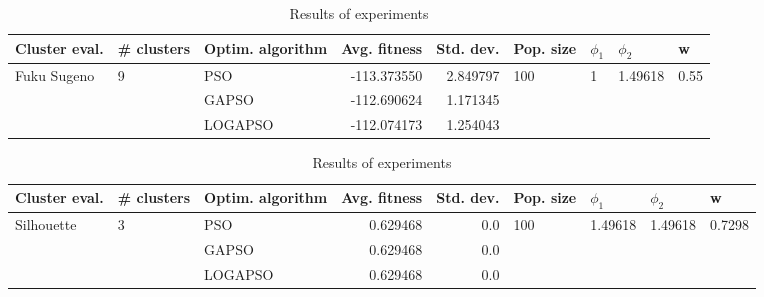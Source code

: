 \documentclass{article}
\begin{document}
\begin{table}
\centering
\caption{Results of experiments}
\begin{tabular}{lllrrllll}
\toprule
               Cluster eval. &        \# clusters & Optim. algorithm &  Avg. fitness &  Std. dev. &            Pop. size &         $\phi_{1}$ &               $\phi_{2}$ &                     w \\
\midrule
\multirow{3}{*}{Fuku Sugeno} & \multirow{3}{*}{9} &              PSO &   -113.373550 &   2.849797 & \multirow{3}{*}{100} & \multirow{3}{*}{1} & \multirow{3}{*}{1.49618} & \multirow{3}{*}{0.55} \\
                             &                    &            GAPSO &   -112.690624 &   1.171345 &                      &                    &                          &                       \\
                             &                    &          LOGAPSO &   -112.074173 &   1.254043 &                      &                    &                          &                       \\
\bottomrule
\end{tabular}
\end{table}
\begin{table}
\centering
\caption{Results of experiments}
\begin{tabular}{lllrrllll}
\toprule
              Cluster eval. &        \# clusters & Optim. algorithm &  Avg. fitness &  Std. dev. &            Pop. size &               $\phi_{1}$ &               $\phi_{2}$ &                       w \\
\midrule
\multirow{3}{*}{Silhouette} & \multirow{3}{*}{3} &              PSO &      0.629468 &        0.0 & \multirow{3}{*}{100} & \multirow{3}{*}{1.49618} & \multirow{3}{*}{1.49618} & \multirow{3}{*}{0.7298} \\
                            &                    &            GAPSO &      0.629468 &        0.0 &                      &                          &                          &                         \\
                            &                    &          LOGAPSO &      0.629468 &        0.0 &                      &                          &                          &                         \\
\bottomrule
\end{tabular}
\end{table}
\end{document}
